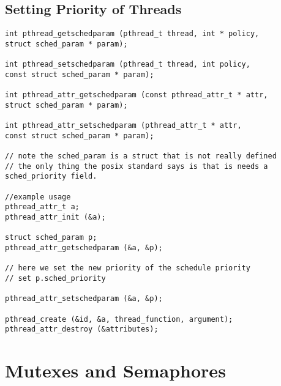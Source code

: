 \documentclass[main.tex,fontsize=8pt,paper=a4,paper=portrait,DIV=calc,]{scrartcl}
\begin{document}
\subsection{Setting Priority of Threads}
\begin{lstlisting}
int pthread_getschedparam (pthread_t thread, int * policy,
struct sched_param * param);

int pthread_setschedparam (pthread_t thread, int policy,
const struct sched_param * param);

int pthread_attr_getschedparam (const pthread_attr_t * attr,
struct sched_param * param);

int pthread_attr_setschedparam (pthread_attr_t * attr,
const struct sched_param * param);

// note the sched_param is a struct that is not really defined
// the only thing the posix standard says is that is needs a sched_priority field.

//example usage
pthread_attr_t a;
pthread_attr_init (&a);

struct sched_param p;
pthread_attr_getschedparam (&a, &p);

// here we set the new priority of the schedule priority
// set p.sched_priority

pthread_attr_setschedparam (&a, &p);

pthread_create (&id, &a, thread_function, argument);
pthread_attr_destroy (&attributes);
\end{lstlisting}

\section{Mutexes and Semaphores}
\end{document}
